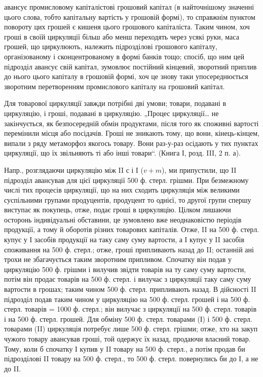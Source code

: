 \parcont{}  %
авансує промисловому капіталістові грошовий капітал (в найточнішому
значенні цього слова, тобто капітальну вартість у грошовій формі), то
справжнім пунктом повороту цих грошей є кишеня цього грошового
капіталіста. Таким чином, хоч гроші в своїй циркуляції більш або менш
переходять через усякі руки, маса грошей, що циркулюють, належить
підрозділові грошового капіталу, організованому і сконцентрованому в
формі банків тощо; спосіб, що ним цей підрозділ авансує свій капітал,
зумовлює постійний кінцевий, зворотний приплив до нього цього капіталу
в грошовій формі, хоч це знову таки упосереднюється зворотним перетворенням
промислового капіталу на грошовий капітал.

Для товарової циркуляції завжди потрібні дві умови; товари, подавані
в циркуляцію, і гроші, подавані в циркуляцію. „Процес циркуляції\dots{} не
закінчується, як безпосередній обмін продуктами, після того як споживні
вартості перемінили місця або посідачів. Гроші не зникають тому, що
вони, кінець-кінцем, випали з ряду метаморфоз якогось товару. Вони раз-у-раз
осідають у тих пунктах циркуляції, що їх звільняють ті або інші
товари“. (Книга І, розд. III, 2 п. а).

Напр., розглядаючи циркуляцію між II с і І ($v + m$), ми припустили,
що II підрозділ авансував для цієї циркуляції 500 ф. стерл. грішми. При
безмежному числі тих процесів циркуляції, що на них сходить циркуляція
між великими суспільними групами продуцентів, продуцент то
однієї, то другої групи спершу виступає як покупець, отже, подає
гроші в циркуляцію. Цілком лишаючи осторонь індивідуальні обставини,
це зумовлено вже неоднаковістю періодів продукції, а тому й оборотів
різних товарових капіталів. Отже, II на 500 ф. стерл. купує у І засобів
продукції на таку саму суму вартости, а І купує у II засобів споживання на
500 ф. стерл.; отже, гроші припливають назад до II; останній ані трохи
не збагачується таким зворотним припливом. Спочатку він подав у циркуляцію
500 ф. грішми і вилучив звідти товарів на ту саму суму вартости,
потім він продає товарів на 500 ф. стерл. і вилучає з циркуляції
таку саму суму вартости в грошах; таким чином 500 ф. стерл. припливають
назад. В дійсності II підрозділ подав таким чином у циркуляцію
на 500 ф. стерл. грошей і на 500 ф. стерл. товарів = 1000 ф. стерл.;
він вилучає з циркуляції на 500 ф. стерл. товарів і на 500 ф. стерл.
грошей. Для обміну 500 ф. стерл. товарами (І) і 500 ф. стерл. товарами
(II) циркуляція потребує лише 500 ф. стерл. грішми; отже,
хто на закуп чужого товару авансував гроші, той одержує їх
назад, продаючи власний товар. Тому, коли б спочатку І купив у II
товару на 500 ф. стерл., а потім продав би підрозділові II товару на
500 ф. стерл., то 500 ф. стерл. повернулись би до І, а не до II.

